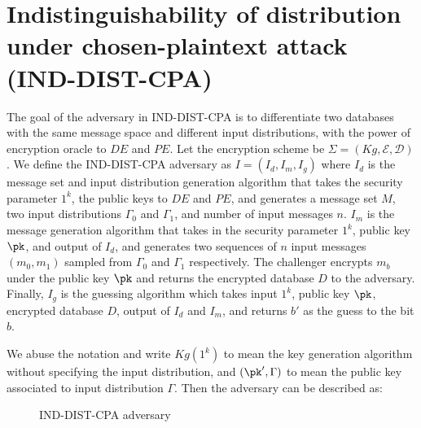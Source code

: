 \section{Indistinguishability of distribution under chosen-plaintext attack (IND-DIST-CPA)}
The goal of the adversary in IND-DIST-CPA is to differentiate two databases with the same message space and different input distributions, with the power of encryption oracle to $DE$ and $PE$. Let the encryption scheme be $\Sigma = (Kg, \mathcal{E}, \mathcal{D})$. We define the IND-DIST-CPA adversary as $I = (I_d, I_m, I_g)$ where $I_d$ is the message set and input distribution generation algorithm that takes the security parameter $1^k$, the public keys to $DE$ and $PE$, and generates a message set $M$, two input distributions $\Gamma_0$ and $\Gamma_1$, and number of input messages $n$. $I_m$ is the message generation algorithm that takes in the security parameter $1^k$, public key $\pk$, and output of $I_d$, and generates two sequences of $n$ input messages $(m_0, m_1)$ sampled from $\Gamma_0$ and $\Gamma_1$ respectively. The challenger encrypts $m_b$ under the public key $\pk$ and returns the encrypted database $D$ to the adversary. Finally, $I_g$ is the guessing algorithm which takes input $1^k$, public key $\pk$, encrypted database $D$, output of $I_d$ and $I_m$, and returns $b'$ as the guess to the bit $b$.

We abuse the notation and write $Kg(1^k)$ to mean the key generation algorithm without specifying the input distribution, and $(\pk', \Gamma)$ to mean the public key associated to input distribution $\Gamma$. Then the adversary can be described as:
\begin{figure}[H]
	\begin{center}
	\end{center}
	\caption{IND-DIST-CPA adversary}
\end{figure}

